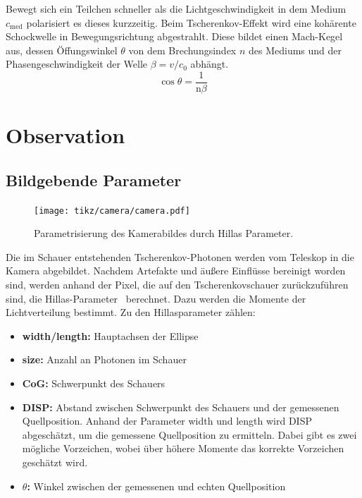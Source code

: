 Bewegt sich ein Teilchen schneller als die Lichtgeschwindigkeit in dem Medium $c_\text{med}$ polarisiert es dieses kurzzeitig. 
Beim Tscherenkov-Effekt wird eine kohärente Schockwelle in Bewegungsrichtung abgestrahlt. 
Diese bildet einen Mach-Kegel aus, dessen Öffungswinkel $\theta$ von dem Brechungsindex $n$ des Mediums und der Phasengeschwindigkeit der Welle $\beta = v / c_\text{0}$ abhängt.
\begin{equation}
  \cos  \theta = \frac{1}{\text{n} \beta}
\end{equation}
\chapter{Observation}
\section{Bildgebende Parameter}
\begin{figure}[H]
  \centering
  \texttt{[image: tikz/camera/camera.pdf]}
  \caption{Parametrisierung des Kamerabildes durch Hillas Parameter.}
\end{figure}
Die im Schauer entstehenden Tscherenkov-Photonen werden vom Teleskop in die Kamera abgebildet.
Nachdem Artefakte und äußere Einflüsse bereinigt worden sind, werden anhand der Pixel, die auf den Tscherenkovschauer zurückzuführen sind, die Hillas-Parameter~\cite{hillas} berechnet. 
Dazu werden die Momente der Lichtverteilung bestimmt. 
Zu den Hillasparameter zählen:
\begin{itemize}
  \item \textbf{width/length:} Hauptachsen der Ellipse
  \item \textbf{size:} Anzahl an Photonen im Schauer
  \item \textbf{CoG:} Schwerpunkt des Schauers
  \item \textbf{DISP:} Abstand zwischen Schwerpunkt des Schauers und der gemessenen Quellposition. Anhand der Parameter width und length wird DISP abgeschätzt, um die gemessene Quellposition zu ermitteln. Dabei gibt es zwei mögliche Vorzeichen, wobei über höhere Momente das korrekte Vorzeichen geschätzt wird.
  \item \textbf{$\theta$:} Winkel zwischen der gemessenen und echten Quellposition
\end{itemize}

